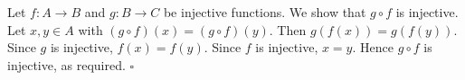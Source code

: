 Let $f : A \to B$ and $g : B \to C$ be injective functions.
We show that $g \circ f$ is injective.
Let $x, y \in A$ with $(g \circ f)(x) = (g \circ f)(y)$.
Then $g(f(x)) = g(f(y))$.
Since $g$ is injective, $f(x) = f(y)$.
Since $f$ is injective, $x = y$.
Hence $g \circ f$ is injective, as required. \hfill$\square$